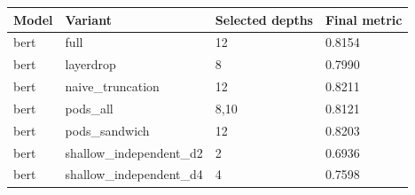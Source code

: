\begin{tabular}{llll}
\hline
Model & Variant & Selected depths & Final metric \\
\hline
bert & full & 12 & 0.8154 \\
bert & layerdrop & 8 & 0.7990 \\
bert & naive\_truncation & 12 & 0.8211 \\
bert & pods\_all & 8,10 & 0.8121 \\
bert & pods\_sandwich & 12 & 0.8203 \\
bert & shallow\_independent\_d2 & 2 & 0.6936 \\
bert & shallow\_independent\_d4 & 4 & 0.7598 \\
\hline
\end{tabular}
